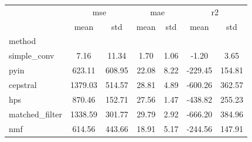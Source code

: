 \begin{tabular}{lcccccc}
\toprule
 & \multicolumn{2}{c}{mse} & \multicolumn{2}{c}{mae} & \multicolumn{2}{c}{r2} \\
 & mean & std & mean & std & mean & std \\
method &  &  &  &  &  &  \\
\midrule
simple\_conv & 7.16 & 11.34 & 1.70 & 1.06 & -1.20 & 3.65 \\
pyin & 623.11 & 608.95 & 22.08 & 8.22 & -229.45 & 154.81 \\
cepstral & 1379.03 & 514.57 & 28.81 & 4.89 & -600.26 & 362.57 \\
hps & 870.46 & 152.71 & 27.56 & 1.47 & -438.82 & 255.23 \\
matched\_filter & 1338.59 & 301.77 & 29.79 & 2.92 & -666.20 & 384.96 \\
nmf & 614.56 & 443.66 & 18.91 & 5.17 & -244.56 & 147.91 \\
\bottomrule
\end{tabular}
